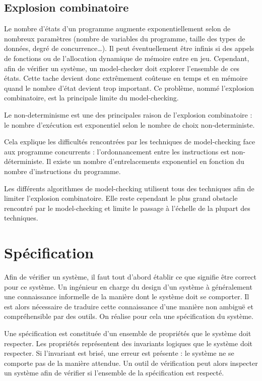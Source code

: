 \subsection{Explosion combinatoire}

Le nombre d'états d'un programme augmente exponentiellement selon de nombreux
paramètres (nombre de variables du programme, taille des types de données, degré
de concurrence\dots). Il peut éventuellement être infinis si des appels de
fonctions ou de l'allocation dynamique de mémoire entre en jeu. Cependant, afin
de vérifier un système, un model-checker doit explorer l'ensemble de ces états.
Cette tache devient donc extrêmement coûteuse en temps et en mémoire quand le
nombre d'état devient trop important.
Ce problème, nommé l'explosion combinatoire, est la principale limite du
model-checking.

Le non-determinisme est une des principales raison de l'explosion combinatoire :
le nombre d'exécution est exponentiel selon le nombre de choix non-deterministe.

Cela explique les difficultés rencontrées par les techniques de model-checking
face aux programme concurrents : l'ordonnancement entre les instructions est
non-déterministe. Il existe un nombre d'entrelacements exponentiel en fonction
du nombre d'instructions du programme.

Les différents algorithmes de model-checking utilisent tous des
techniques afin de limiter l'explosion combinatoire. Elle reste
cependant le plus grand obstacle rencontré par le model-checking et
limite le passage à l'échelle de la plupart des techniques.

\section{Spécification}\label{sec:specification}

Afin de vérifier un système, il faut tout d'abord établir ce que signifie être
correct pour ce système. Un ingénieur en charge du design d'un système à
généralement une connaissance informelle de la manière dont le système doit se
comporter. Il est alors nécessaire de traduire cette connaissance d'une manière
non ambiguë et compréhensible par des outils. On réalise pour cela une
spécification du système.

Une spécification est constituée d'un ensemble de propriétés que le système doit
respecter. Les propriétés représentent des invariants logiques que le système
doit respecter. Si l'invariant est brisé, une erreur est présente : le système ne
se comporte pas de la manière attendue. Un outil de vérification peut alors inspecter
un système afin de vérifier si l'ensemble de la spécification est respecté.

